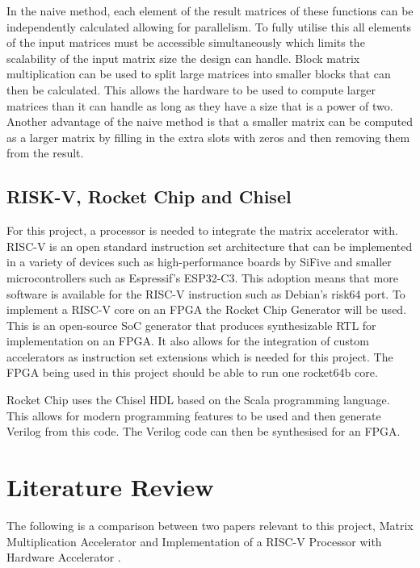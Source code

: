 \documentclass[a4paper,fleqn,12pt]{article}
\begin{document}
	In the naive method, each element of the result matrices of these functions can be independently calculated allowing for parallelism. To fully utilise this all elements of the input matrices must be accessible simultaneously which limits the scalability of the input matrix size the design can handle. Block matrix multiplication can be used to split large matrices into smaller blocks that can then be calculated. This allows the hardware to be used to compute larger matrices than it can handle as long as they have a size that is a power of two. Another advantage of the naive method is that a smaller matrix can be computed as a larger matrix by filling in the extra slots with zeros and then removing them from the result.
	
	\subsection{RISK-V, Rocket Chip and Chisel}
	For this project, a processor is needed to integrate the matrix accelerator with. RISC-V is an open standard instruction set architecture that can be implemented in a variety of devices such as high-performance boards by SiFive and smaller microcontrollers such as Espressif's ESP32-C3. This adoption means that more software is available for the RISC-V instruction such as Debian's risk64 port. To implement a RISC-V core on an FPGA the Rocket Chip Generator will be used. This is an open-source SoC generator that produces synthesizable RTL for implementation on an FPGA. It also allows for the integration of custom accelerators as instruction set extensions \citep{rocketchip} which is needed for this project. The FPGA being used in this project should be able to run one rocket64b core.
	
	Rocket Chip uses the Chisel HDL based on the Scala programming language. This allows for modern programming features to be used and then generate Verilog from this code. The Verilog code can then be synthesised for an FPGA.
	
	\section{Literature Review}
	The following is a comparison between two papers relevant to this project, Matrix Multiplication Accelerator \citep{matrix_mult_accel} and Implementation of a RISC-V Processor with Hardware Accelerator \citep{risc-v_hard_accel}.
	
\end{document}
